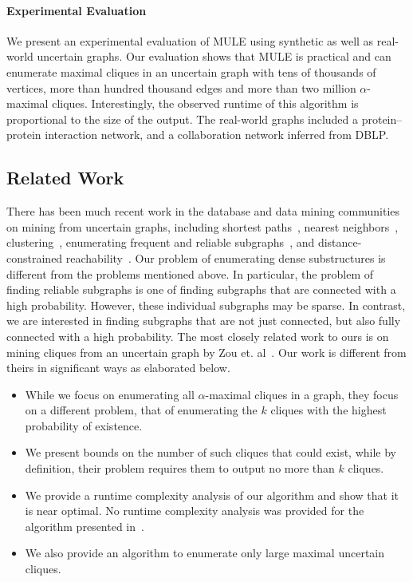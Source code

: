 \documentclass[11pt,letterpaper]{article}
\begin{document}
\paragraph{Experimental Evaluation}
We present an experimental evaluation of MULE using synthetic as well as real-world uncertain graphs. Our evaluation shows that MULE is practical and can enumerate maximal cliques in an uncertain graph with tens of thousands of vertices, more than hundred thousand edges and more than two million $\alpha$-maximal cliques. Interestingly, the observed runtime of this algorithm is proportional to the size of the output. The real-world graphs included a protein--protein interaction network, and a collaboration network inferred from DBLP. 

\subsection{Related Work}
\label{sec:related}
There has been much recent work in the database and data mining communities on mining from uncertain graphs, including shortest paths~\cite{YCW2010}, nearest neighbors~\cite{PBGK2010}, clustering~\cite{KPT2013}, enumerating frequent and reliable subgraphs~\cite{HT2008,ZLGZ2010,JLA2011,ZGL2010,LRAY2012,KBGG2014},
and distance-constrained reachability~\cite{JLDW2011}. Our problem of enumerating dense substructures is different from the problems mentioned above. In particular, the problem of finding reliable subgraphs is one of finding subgraphs that are connected with a high probability. However, these individual subgraphs may be sparse. In contrast, we are interested in finding subgraphs that are not just connected, but also fully connected with a high probability. 
The most closely related work to ours is on mining cliques from an uncertain graph by Zou et. al~\cite{ZJHS2010}. Our work is different from theirs in significant ways as elaborated below.
\begin{itemize}
\item While we focus on enumerating all $\alpha$-maximal cliques in a graph, they focus on a different problem, that of enumerating the $k$ cliques with the highest probability of existence.

\item We present bounds on the number of such cliques that could exist, while by definition, their problem requires them to output no more than $k$ cliques.

\item We provide a runtime complexity analysis of our algorithm and show that it is near optimal. No runtime complexity analysis was provided for the algorithm presented in~\cite{ZJHS2010}.

\item We also provide an algorithm to enumerate only large maximal uncertain cliques.
\end{itemize}
\end{document}
